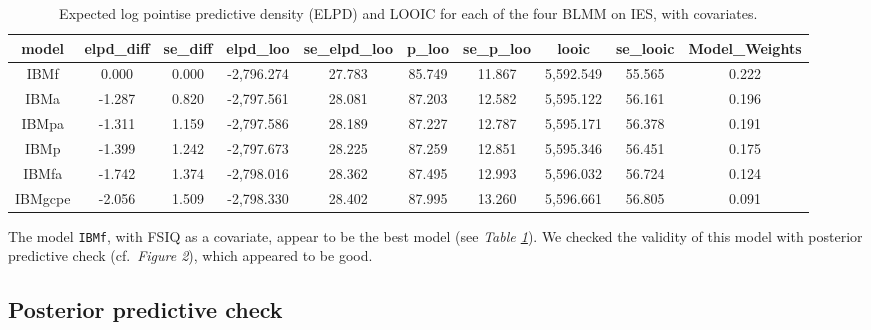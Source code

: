 \documentclass[
  11pt,
  english,
  ,doc,floatsintext]{apa6}
\begin{document}
\begin{table}[htb]

\begin{center}
\begin{threeparttable}

\caption{\label{tab:modelCompIES2}Expected log pointise predictive density (ELPD) and LOOIC for each of the four BLMM on IES, with covariates.}

\tiny{

\begin{tabular}{cccccccccc}
\toprule
model & \multicolumn{1}{c}{elpd\_diff} & \multicolumn{1}{c}{se\_diff} & \multicolumn{1}{c}{elpd\_loo} & \multicolumn{1}{c}{se\_elpd\_loo} & \multicolumn{1}{c}{p\_loo} & \multicolumn{1}{c}{se\_p\_loo} & \multicolumn{1}{c}{looic} & \multicolumn{1}{c}{se\_looic} & \multicolumn{1}{c}{Model\_Weights}\\
\midrule
IBMf & 0.000 & 0.000 & -2,796.274 & 27.783 & 85.749 & 11.867 & 5,592.549 & 55.565 & 0.222\\
IBMa & -1.287 & 0.820 & -2,797.561 & 28.081 & 87.203 & 12.582 & 5,595.122 & 56.161 & 0.196\\
IBMpa & -1.311 & 1.159 & -2,797.586 & 28.189 & 87.227 & 12.787 & 5,595.171 & 56.378 & 0.191\\
IBMp & -1.399 & 1.242 & -2,797.673 & 28.225 & 87.259 & 12.851 & 5,595.346 & 56.451 & 0.175\\
IBMfa & -1.742 & 1.374 & -2,798.016 & 28.362 & 87.495 & 12.993 & 5,596.032 & 56.724 & 0.124\\
IBMgcpe & -2.056 & 1.509 & -2,798.330 & 28.402 & 87.995 & 13.260 & 5,596.661 & 56.805 & 0.091\\
\bottomrule
\end{tabular}

}

\end{threeparttable}
\end{center}

\end{table}

The model \texttt{IBMf}, with FSIQ as a covariate, appear to be the best model (see \emph{Table \ref{tab:modelCompIES2}}). We checked the validity of this model with posterior predictive check (cf.~\emph{Figure 2}), which appeared to be good.

\hypertarget{posterior-predictive-check-2}{%
\subsection{Posterior predictive check}\label{posterior-predictive-check-2}}
\end{document}
